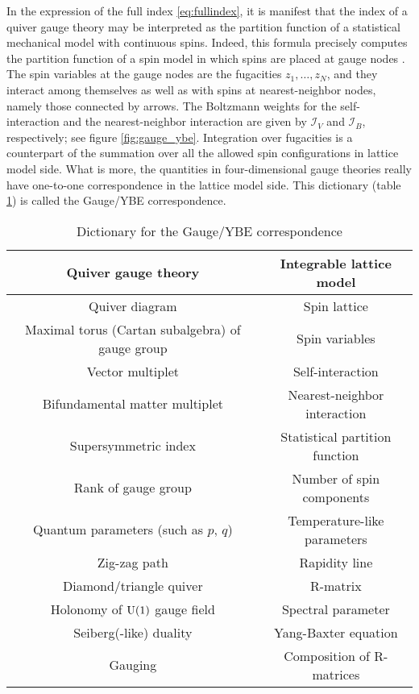 In the expression of the full index \eqref{eq:fullindex},
it is manifest that the index of a quiver gauge theory may be interpreted
as the partition function of a statistical mechanical model with continuous
spins. Indeed, this formula precisely computes the partition function
of a spin model in which spins are placed at gauge nodes \cite{Yamazaki:2012cp,Yagi:2015lha}.
The spin variables at the gauge nodes are the fugacities $z_{1},\ldots,z_{N}$, and
they interact among themselves as well as with spins at nearest-neighbor
nodes, namely those connected by arrows. The Boltzmann weights for
the self-interaction and the nearest-neighbor interaction are given by $\mathcal{I}_{V}$
and $\mathcal{I}_{B}$, respectively; see figure \ref{fig:gauge_ybe}.
Integration over fugacities is a counterpart of the summation over all the
allowed spin configurations in lattice model side.
What is more, the quantities in four-dimensional gauge theories really have one-to-one
correspondence in the lattice model side.
This dictionary (table \ref{tab:gauge_ybe}) is called the Gauge/YBE correspondence.


\begin{table}
\caption{Dictionary for the Gauge/YBE correspondence}
\vspace{0.2cm}
  \centering
    \begin{tabular}{c|c}
Quiver gauge theory     & Integrable lattice model  \tabularnewline
\hline
\hline
Quiver diagram          & Spin lattice  \tabularnewline
Maximal torus (Cartan subalgebra) of gauge group & Spin variables  \tabularnewline
Vector multiplet        & Self-interaction  \tabularnewline
Bifundamental matter multiplet & Nearest-neighbor interaction  \tabularnewline
Supersymmetric index    & Statistical partition function  \tabularnewline
Rank of gauge group     & Number of spin components  \tabularnewline
Quantum parameters (such as $p,\,q$) & Temperature-like parameters  \tabularnewline
Zig-zag path            & Rapidity line  \tabularnewline
Diamond/triangle quiver & R-matrix   \tabularnewline
Holonomy of $\mathrm{U}(1)$ gauge field & Spectral parameter  \tabularnewline  %
Seiberg(-like) duality  & Yang-Baxter equation  \tabularnewline
Gauging                 & Composition of R-matrices   \tabularnewline
    \end{tabular}
\label{tab:gauge_ybe}
\end{table}








